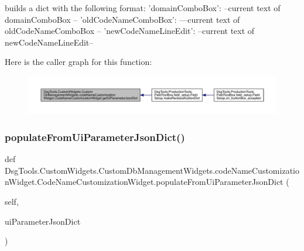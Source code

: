 \begin{DoxyVerb}builds a dict with the following format:
{
    'domainComboBox': --current text of domainComboBox --
    'oldCodeNameComboBox': ---current text of oldCodeNameComboBox --
    'newCodeNameLineEdit': --current text of newCodeNameLineEdit--
}
\end{DoxyVerb}
 Here is the caller graph for this function\+:
\nopagebreak
\begin{figure}[H]
\begin{center}
\leavevmode
\includegraphics[width=350pt]{class_dsg_tools_1_1_custom_widgets_1_1_custom_db_management_widgets_1_1code_name_customization_wf164086e8f1ece2de77d7ffd06fc1ae2_a346f15ae7b69dcef65ccf5c077b3d443_icgraph}
\end{center}
\end{figure}
\mbox{\label{class_dsg_tools_1_1_custom_widgets_1_1_custom_db_management_widgets_1_1code_name_customization_wf164086e8f1ece2de77d7ffd06fc1ae2_a1e1eac31ae714c40edf69ab155e17c41}} 
\subsubsection{\texorpdfstring{populate\+From\+Ui\+Parameter\+Json\+Dict()}{populateFromUiParameterJsonDict()}}
{\footnotesize\ttfamily def Dsg\+Tools.\+Custom\+Widgets.\+Custom\+Db\+Management\+Widgets.\+code\+Name\+Customization\+Widget.\+Code\+Name\+Customization\+Widget.\+populate\+From\+Ui\+Parameter\+Json\+Dict (\begin{DoxyParamCaption}\item[{}]{self,  }\item[{}]{ui\+Parameter\+Json\+Dict }\end{DoxyParamCaption})}

